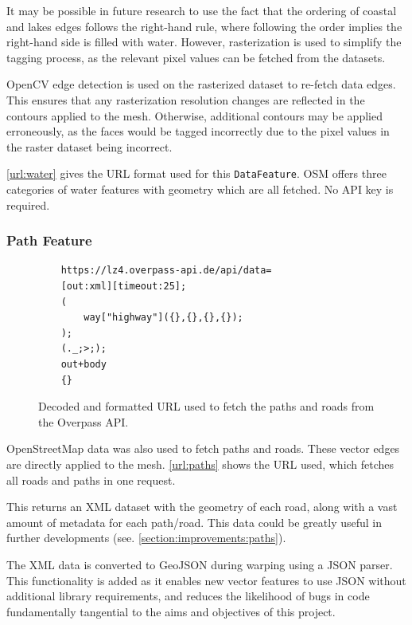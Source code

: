 \documentclass[12pt]{article}
\begin{document}
It may be possible in future research to use the fact that the ordering of coastal and lakes edges follows the right-hand rule, where following the order implies the right-hand side is filled with water. However, rasterization is used to simplify the tagging process, as the relevant pixel values can be fetched from the datasets.

OpenCV edge detection is used on the rasterized dataset to re-fetch data edges. This ensures that any rasterization resolution changes are reflected in the contours applied to the mesh. Otherwise, additional contours may be applied erroneously, as the faces would be tagged incorrectly due to the pixel values in the raster dataset being incorrect.

\autoref{url:water} gives the URL format used for this \texttt{DataFeature}. OSM offers three categories of water features with geometry which are all fetched. No API key is required.

\subsubsection{Path Feature}

\begin{figure}[H]
  \centering
  \begin{lstlisting}
	https://lz4.overpass-api.de/api/data=
	[out:xml][timeout:25];
	(
		way["highway"]({},{},{},{});
	);
	(._;>;);
	out+body
	{}
	\end{lstlisting}
  \vspace{-2em}
  \caption{Decoded and formatted URL used to fetch the paths and roads from the Overpass API.}
  \label{url:paths}
\end{figure}

OpenStreetMap data was also used to fetch paths and roads. These vector edges are directly applied to the mesh. \autoref{url:paths} shows the URL used, which fetches all roads and paths in one request.

This returns an XML dataset with the geometry of each road, along with a vast amount of metadata for each path/road. This data could be greatly useful in further developments (see. \autoref{section:improvements:paths}).

The XML data is converted to GeoJSON during warping using a JSON parser. This functionality is added as it enables new vector features to use JSON without additional library requirements, and reduces the likelihood of bugs in code fundamentally tangential to the aims and objectives of this project.
\end{document}
